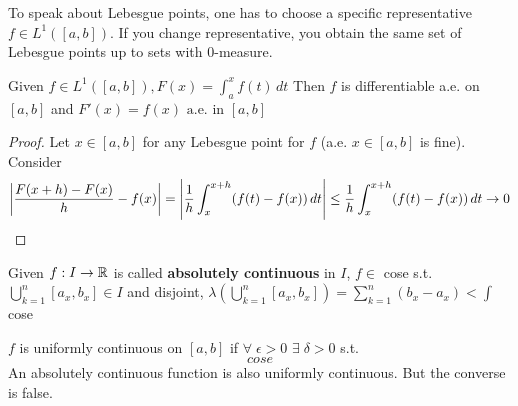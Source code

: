 To speak about Lebesgue points, one has to choose a specific representative \(f \in L^1([a,b])\). If you change representative, you obtain the same set of Lebesgue points up to sets with \(0\)-measure.
\begin{theorem}
Given \(f \in L^1([a,b]), F(x) = \int_a^xf(t) \, dt\)
Then \(f\) is differentiable a.e. on \([a,b]\) and \(F'(x) = f(x) \text{ a.e. in } [a,b]\)    
\end{theorem}
\begin{proof}
    Let \(x \in [a,b]\) for any Lebesgue point for \(f\) (a.e. \(x \in [a,b]\) is fine). Consider
    \[
        \left|{\frac{F(x+h)-F(x)}{h} - f(x)}\right| = \abs{\frac{1}{h} \int_x^{x+h} (f(t) - f(x)) \,dt } \leq \frac{1}{h} \int_x^{x+h} (f(t) - f(x)) \,dt \to 0 
    \]
\end{proof}
\begin{definition}
    Given \(f : I \to \mathbb{R}\) is called \textbf{absolutely continuous} in \(I\), \(f \in\) cose 
    s.t. 
    \(\bigcup_{k=1}^n [a_x, b_x] \in I\) and disjoint, \(\lambda(\bigcup_{k=1}^n [a_x, b_x]) = \sum_{k=1}^n (b_x -a_x) < \int\)
    cose
\end{definition}
\begin{remark}
    \(f\) is uniformly continuous on \([a,b]\) if \(\forall \; \epsilon > 0\) \(\exists \; \delta > 0\) s.t. 
    \[
         cose
    \]
    An absolutely continuous function is also uniformly continuous.
    But the converse is false.
\end{remark}

